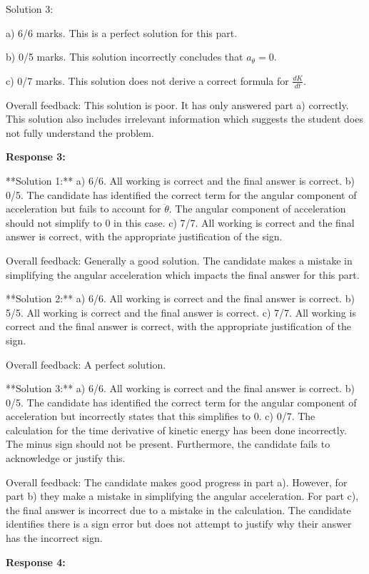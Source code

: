\documentclass[a4paper,11pt]{article}
\begin{document}
Solution 3:

a) 6/6 marks. This is a perfect solution for this part.

b) 0/5 marks. This solution incorrectly concludes that \( a_{\theta} = 0 \).

c) 0/7 marks. This solution does not derive a correct formula for \( \frac{dK}{dt} \).

Overall feedback:
This solution is poor. It has only answered part a) correctly. This solution also includes irrelevant information which suggests the student does not fully understand the problem.

\bigskip    
\textbf{Response 3:}

**Solution 1:**
a) 6/6. All working is correct and the final answer is correct.
b) 0/5. The candidate has identified the correct term for the angular component of acceleration but fails to account for \(\ddot{\theta}\). The angular component of acceleration should not simplify to \(0\) in this case.
c) 7/7. All working is correct and the final answer is correct, with the appropriate justification of the sign.

Overall feedback: Generally a good solution. The candidate makes a mistake in simplifying the angular acceleration which impacts the final answer for this part.

**Solution 2:**
a) 6/6. All working is correct and the final answer is correct.
b) 5/5. All working is correct and the final answer is correct.
c) 7/7. All working is correct and the final answer is correct, with the appropriate justification of the sign.

Overall feedback: A perfect solution.

**Solution 3:**
a) 6/6. All working is correct and the final answer is correct.
b) 0/5. The candidate has identified the correct term for the angular component of acceleration but incorrectly states that this simplifies to 0.
c) 0/7. The calculation for the time derivative of kinetic energy has been done incorrectly. The minus sign should not be present. Furthermore, the candidate fails to acknowledge or justify this.

Overall feedback: The candidate makes good progress in part a). However, for part b) they make a mistake in simplifying the angular acceleration. For part c), the final answer is incorrect due to a mistake in the calculation. The candidate identifies there is a sign error but does not attempt to justify why their answer has the incorrect sign.

\bigskip    
\textbf{Response 4:}
\end{document}
